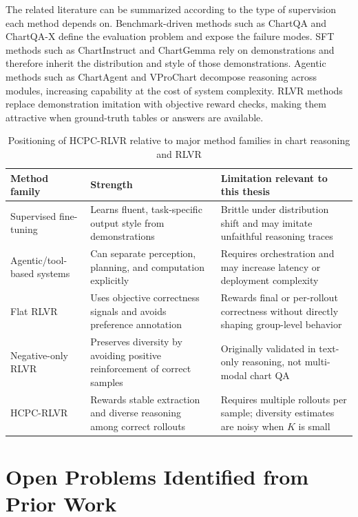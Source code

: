 \documentclass{iutbscthesis}
\begin{document}
The related literature can be summarized according to the type of supervision each method depends on. Benchmark-driven methods such as ChartQA and ChartQA-X define the evaluation problem and expose the failure modes. SFT methods such as ChartInstruct and ChartGemma rely on demonstrations and therefore inherit the distribution and style of those demonstrations. Agentic methods such as ChartAgent and VProChart decompose reasoning across modules, increasing capability at the cost of system complexity. RLVR methods replace demonstration imitation with objective reward checks, making them attractive when ground-truth tables or answers are available.

\begin{table}[H]
    \centering
    \begin{tabular}{p{3.3cm}p{4.3cm}p{4.4cm}}
        \toprule
        Method family & Strength & Limitation relevant to this thesis \\
        \midrule
        Supervised fine-tuning & Learns fluent, task-specific output style from demonstrations & Brittle under distribution shift and may imitate unfaithful reasoning traces \\
        Agentic/tool-based systems & Can separate perception, planning, and computation explicitly & Requires orchestration and may increase latency or deployment complexity \\
        Flat RLVR & Uses objective correctness signals and avoids preference annotation & Rewards final or per-rollout correctness without directly shaping group-level behavior \\
        Negative-only RLVR & Preserves diversity by avoiding positive reinforcement of correct samples & Originally validated in text-only reasoning, not multi-modal chart QA \\
        HCPC-RLVR & Rewards stable extraction and diverse reasoning among correct rollouts & Requires multiple rollouts per sample; diversity estimates are noisy when $K$ is small \\
        \bottomrule
    \end{tabular}
    \caption{Positioning of HCPC-RLVR relative to major method families in chart reasoning and RLVR}
    \label{tab:method_families}
\end{table}

\section{Open Problems Identified from Prior Work}
\end{document}
